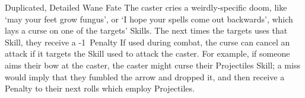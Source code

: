   {Duplicated, Detailed}%
  {Wane}%
  {Fate}%
  {}%
  {The caster cries a weirdly-specific doom, like `may your feet grow fungus', or `I hope your spells come out backwards', which lays a curse on one of the targets' Skills.
  The next  times the targets uses that Skill, they receive a -1~Penalty}%
  {If used during combat, the curse can cancel an attack if it targets the Skill used to attack the caster.
  For example, if someone aims their bow at the caster, the caster might curse their Projectiles Skill; a miss would imply that they fumbled the arrow and dropped it, and then receive a Penalty to their next  rolls which employ Projectiles.}
